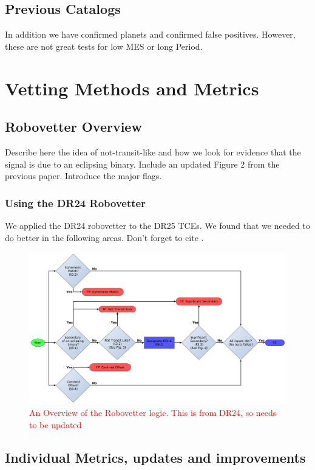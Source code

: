\documentclass[onecolumn]{aastex6}
\newcommand\red{\textcolor{red}}
\begin{document}
\subsection{Previous Catalogs}In addition we have confirmed planets and confirmed false positives. However, these are not great tests for low MES or long Period.


\section{Vetting Methods and Metrics}
\label{s:robovetter}
\subsection{Robovetter Overview}
Describe here the idea of not-transit-like and how we look for evidence that the signal is due to an eclipsing binary. Include an updated Figure 2 from the previous paper. Introduce the major flags.
\subsubsection{Using the DR24 Robovetter}
 We applied the DR24 robovetter to the DR25 TCEs. 
 We found that we needed to do better in the following areas.
 Don't forget to cite \citet{Tange2011a}.
 

\begin{figure}
\centering
\includegraphics[width=\linewidth]{RoboVetter-Diagram-V3-Overview.pdf}
\caption{\red{An Overview of the Robovetter logic. This is from DR24, so needs to be updated}}
\end{figure}

\subsection{Individual Metrics, updates and improvements}
\end{document}
